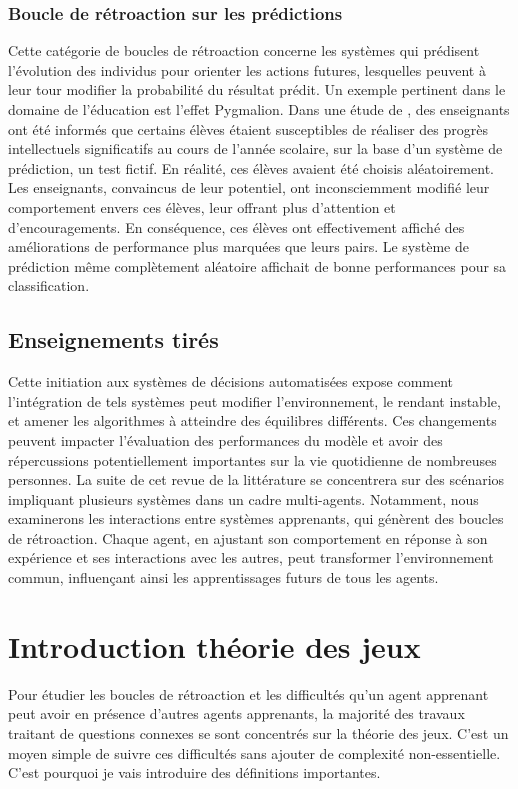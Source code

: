\documentclass{article}
\theoremstyle{definition}
\begin{document}
\subsubsection{Boucle de rétroaction sur les prédictions}
Cette catégorie de boucles de rétroaction concerne les systèmes qui prédisent l'évolution des individus pour orienter les actions futures, lesquelles peuvent à leur tour modifier la probabilité du résultat prédit. Un exemple pertinent dans le domaine de l'éducation est l'effet Pygmalion. Dans une étude de \citet{brookover_review_1969}, des enseignants ont été informés que certains élèves étaient susceptibles de réaliser des progrès intellectuels significatifs au cours de l'année scolaire, sur la base d'un système de prédiction, un test fictif. En réalité, ces élèves avaient été choisis aléatoirement. Les enseignants, convaincus de leur potentiel, ont inconsciemment modifié leur comportement envers ces élèves, leur offrant plus d'attention et d'encouragements. En conséquence, ces élèves ont effectivement affiché des améliorations de performance plus marquées que leurs pairs. Le système de prédiction même complètement aléatoire affichait de bonne performances pour sa classification. 


\subsection{Enseignements tirés}
Cette initiation aux systèmes de décisions automatisées expose comment l'intégration de tels systèmes peut modifier l'environnement, le rendant instable, et amener les algorithmes à atteindre des équilibres différents. Ces changements peuvent impacter l'évaluation des performances du modèle et avoir des répercussions potentiellement importantes sur la vie quotidienne de nombreuses personnes. La suite de cet revue de la littérature se concentrera sur des scénarios impliquant plusieurs systèmes dans un cadre multi-agents. Notamment, nous examinerons les interactions entre systèmes apprenants, qui génèrent des boucles de rétroaction. Chaque agent, en ajustant son comportement en réponse à son expérience et ses interactions avec les autres, peut transformer l'environnement commun, influençant ainsi les apprentissages futurs de tous les agents.

\section{Introduction théorie des jeux}
Pour étudier les boucles de rétroaction et les difficultés qu’un agent apprenant peut avoir en présence d’autres agents apprenants, la majorité des travaux traitant de questions connexes se sont concentrés sur la théorie des jeux. C’est un moyen simple de suivre ces difficultés sans ajouter de complexité non-essentielle. C'est pourquoi je vais introduire des définitions importantes.
\end{document}
